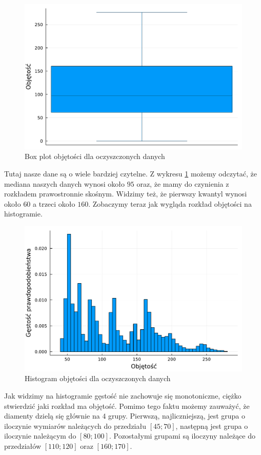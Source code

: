 \documentclass[12pt]{article}
\theoremstyle{exer}
\begin{document}
	\begin{figure}[H]
		\centering
		\includegraphics[width=3\columnwidth/4]{images/Budnik/boxplot_V_danych.pdf}
		\caption{Box plot objętości dla oczyszczonych danych}
		\label{fig:box_V}
	\end{figure}
	Tutaj nasze dane są o wiele bardziej czytelne. Z wykresu \ref{fig:box_V} możemy odczytać, że mediana naszych danych wynosi około $95$ oraz, że mamy do czynienia z rozkładem prawostronnie skośnym. Widzimy też, że pierwszy kwantyl wynosi około $60$ a trzeci około $160$.
	Zobaczymy teraz jak wygląda rozkład objętości na histogramie.
	\begin{figure}[H]
		\centering
		\includegraphics[width=4\columnwidth/5]{images/histogram_V.pdf}
		\caption{Histogram objętości dla oczyszczonych danych}
		\label{fig:hist_V}
	\end{figure}
	Jak widzimy na histogramie gęstość nie zachowuje się monotoniczne, ciężko stwierdzić jaki rozkład ma objętość. Pomimo tego faktu możemy zauważyć, że diamenty dzielą się głównie na $4$ grupy. Pierwszą, najliczniejszą, jest grupa o iloczynie wymiarów należących do przedziału $[45;70] $, następną jest grupa o iloczynie należącym do $[80;100]$. Pozostałymi grupami są iloczyny należące do przedziałów $[110;120]$ oraz $[160;170]$.
	
\end{document}
